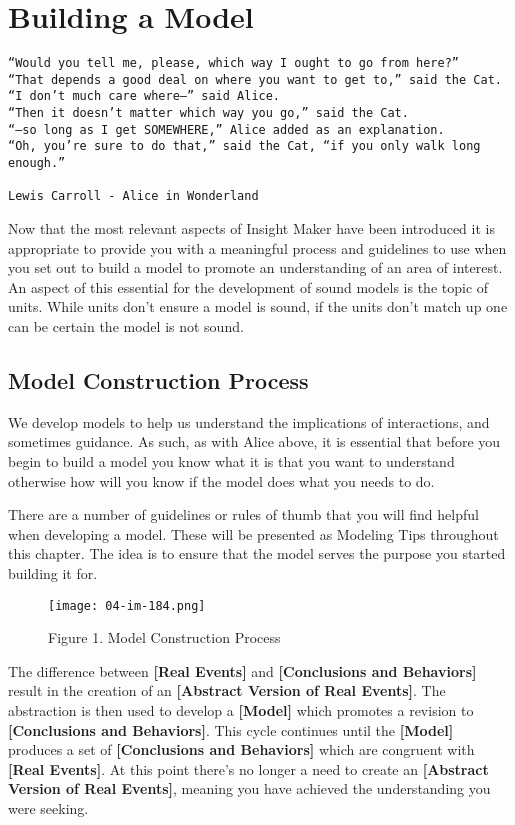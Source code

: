 \documentclass[]{memoir}
\makeatletter
\def\maxwidth{\ifdim\Gin@nat@width>\linewidth\linewidth
\else\Gin@nat@width\fi}
\let\Oldincludegraphics\includegraphics
\renewcommand{\includegraphics}[1]{\Oldincludegraphics[width=\maxwidth]{#1}}
\newcommand{\p}[1]{\textbf{{[}#1{]}}}
\makeatother
\begin{document}
\chapter{Building a Model}

\begin{verbatim}
“Would you tell me, please, which way I ought to go from here?”
“That depends a good deal on where you want to get to,” said the Cat.
“I don’t much care where–” said Alice.
“Then it doesn’t matter which way you go,” said the Cat.
“–so long as I get SOMEWHERE,” Alice added as an explanation.
“Oh, you’re sure to do that,” said the Cat, “if you only walk long enough.”

Lewis Carroll - Alice in Wonderland
\end{verbatim}

Now that the most relevant aspects of Insight Maker have been introduced
it is appropriate to provide you with a meaningful process and
guidelines to use when you set out to build a model to promote an
understanding of an area of interest. An aspect of this essential for
the development of sound models is the topic of units. While units don't
ensure a model is sound, if the units don't match up one can be certain
the model is not sound.

\section{Model Construction Process}

We develop models to help us understand the implications of
interactions, and sometimes guidance. As such, as with Alice above, it
is essential that before you begin to build a model you know what it is
that you want to understand otherwise how will you know if the model
does what you needs to do.

There are a number of guidelines or rules of thumb that you will find
helpful when developing a model. These will be presented as Modeling
Tips throughout this chapter. The idea is to ensure that the model
serves the purpose you started building it for.

\begin{figure}[htbp]
\centering
\texttt{[image: 04-im-184.png]}
\caption{Figure 1. Model Construction Process}
\end{figure}

The difference between \p{Real Events} and \p{Conclusions and Behaviors}
result in the creation of an \p{Abstract Version of Real Events}. The
abstraction is then used to develop a \p{Model} which promotes a
revision to \p{Conclusions and Behaviors}. This cycle continues until
the \p{Model} produces a set of \p{Conclusions and Behaviors} which are
congruent with \p{Real Events}. At this point there's no longer a need
to create an \p{Abstract Version of Real Events}, meaning you have
achieved the understanding you were seeking.
\end{document}
